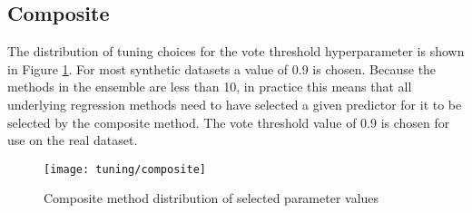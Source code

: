 \subsection{Composite}
The distribution of tuning choices for the vote threshold hyperparameter is shown in Figure \ref{fig:tun_composite}. For most synthetic datasets a value of 0.9 is chosen. Because the methods in the ensemble are less than 10, in practice this means that all underlying regression methods need to have selected a given predictor for it to be selected by the composite method. The vote threshold value of 0.9 is chosen for use on the real dataset.
\begin{figure}[H]
	\centering
	\texttt{[image: tuning/composite]}
	\caption{Composite method distribution of selected parameter values}
	\label{fig:tun_composite}
\end{figure}
